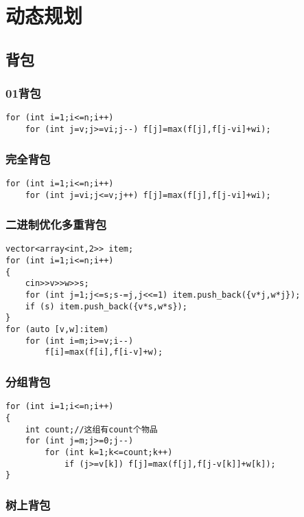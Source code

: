 \documentclass[a4paper]{ctexart}
\begin{document}
\section{动态规划}

\subsection{背包}

\subsubsection{01背包}

\begin{lstlisting}
for (int i=1;i<=n;i++)
    for (int j=v;j>=vi;j--) f[j]=max(f[j],f[j-vi]+wi);
\end{lstlisting}

\subsubsection{完全背包}

\begin{lstlisting}
for (int i=1;i<=n;i++)
    for (int j=vi;j<=v;j++) f[j]=max(f[j],f[j-vi]+wi);
\end{lstlisting}


\subsubsection{二进制优化多重背包}

\begin{lstlisting}
vector<array<int,2>> item;
for (int i=1;i<=n;i++)
{
    cin>>v>>w>>s;
    for (int j=1;j<=s;s-=j,j<<=1) item.push_back({v*j,w*j});
    if (s) item.push_back({v*s,w*s});
}
for (auto [v,w]:item)
    for (int i=m;i>=v;i--)
        f[i]=max(f[i],f[i-v]+w);
\end{lstlisting}

\subsubsection{分组背包}

\begin{lstlisting}
for (int i=1;i<=n;i++)
{
    int count;//这组有count个物品
    for (int j=m;j>=0;j--)
        for (int k=1;k<=count;k++)
            if (j>=v[k]) f[j]=max(f[j],f[j-v[k]]+w[k]);
}
\end{lstlisting}

\subsubsection{树上背包}
\end{document}
